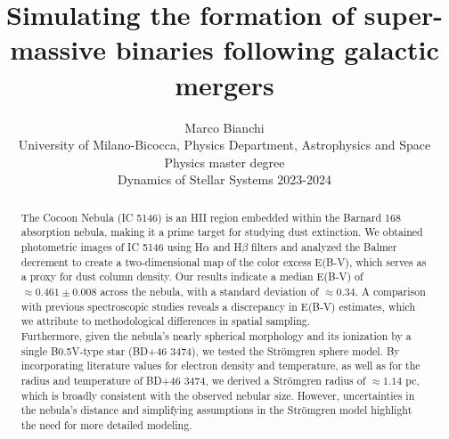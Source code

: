 \documentclass[fleqn,usenatbib]{mnras}
\title[]{Simulating the formation of super-massive binaries following galactic mergers}
\author[Marco Bianchi]{
Marco Bianchi
\\
University of Milano-Bicocca, Physics Department, Astrophysics and Space Physics master degree\\
Dynamics of Stellar Systems 2023-2024
}
\begin{document}
\label{firstpage}
\pagerange{\pageref{firstpage}--\pageref{lastpage}}
\maketitle

\begin{abstract}
  \large The Cocoon Nebula (IC 5146) is an HII region embedded within the Barnard 168 absorption nebula, making it a prime target for studying dust extinction. 
  We obtained photometric images of IC 5146 using H$\alpha$ and H$\beta$ filters and analyzed the Balmer decrement to create a two-dimensional map of the color excess E(B-V), which serves as a proxy for dust column density. 
  Our results indicate a median E(B-V) of $\approx 0.461 \pm 0.008$ across the nebula, with a standard deviation of $\approx 0.34$. 
  A comparison with previous spectroscopic studies reveals a discrepancy in E(B-V) estimates, which we attribute to methodological differences in spatial sampling.\\
  Furthermore, given the nebula's nearly spherical morphology and its ionization by a single B0.5V-type star (BD+46 3474), we tested the Strömgren sphere model. 
  By incorporating literature values for electron density and temperature, as well as for the radius and temperature of BD+46 3474, we derived a Strömgren radius of $\approx 1.14$ pc, which is broadly consistent with the observed nebular size. 
  However, uncertainties in the nebula's distance and simplifying assumptions in the Strömgren model highlight the need for more detailed modeling.
\end{abstract} 




\end{document}
